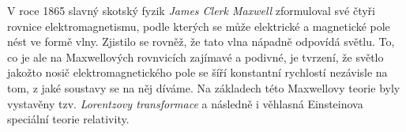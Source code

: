 \documentclass{../../../../style/mkimain}
\begin{document}
\noindent{}
\proborigin{}
\klein

V roce 1865 slavný skotský fyzik \emph{James Clerk Maxwell} zformuloval své čtyři rovnice elektromagnetismu,
podle kterých se může elektrické a magnetické pole nést ve formě vlny. Zjistilo se rovněž, že tato vlna nápadně odpovídá světlu.
To, co je ale na Maxwellových rovnvicích zajímavé a podivné, je tvrzení,
že světlo jakožto nosič elektromagnetického pole se šíří konstantní rychlostí nezávisle na tom, z jaké soustavy se na něj díváme.
Na základech této Maxwellovy teorie byly vystavěny tzv. \emph{Lorentzovy transformace}
a následně i věhlasná Einsteinova speciální teorie relativity.
\end{document}

